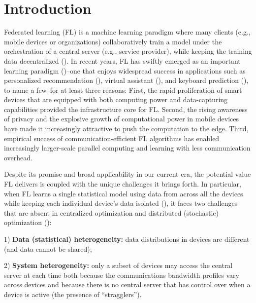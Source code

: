 

\section{Introduction}
Federated learning (FL) \cite{konevcny2016federated} is a machine learning paradigm where many clients (e.g., mobile devices or organizations) collaboratively train a model under the orchestration of a central server (e.g., service provider), while keeping the training data decentralized (\cite{smith2017federated, kairouz2019advances}). In recent years, FL has swiftly emerged as an important learning paradigm (\cite{mcmahan2016communication,li2018federated})--one that enjoys widespread success in applications such as personalized recommendation (\cite{chen2018federated}), virtual assistant (\cite{lam2019protecting}), and keyboard prediction (\cite{47586}), to name a few--for at least three reasons: First, the rapid proliferation of smart devices that are equipped with both computing power and data-capturing capabilities provided the infrastructure core for FL. Second, the rising awareness of privacy and the explosive growth of computational power in mobile devices have made it increasingly attractive to push the computation to the edge. Third, empirical success of communication-efficient FL algorithms has enabled increasingly larger-scale parallel computing and learning with less communication overhead.

Despite its promise and broad applicability in our current era, the potential value FL delivers is coupled with the unique challenges it brings forth. In particular, when FL learns a single statistical model using data from across all the devices while keeping each individual device's data isolated (\cite{kairouz2019advances}), it faces two challenges that are absent in centralized optimization and distributed (stochastic) optimization (\cite{nedic2009distributed,ram2010distributed,duchi2011dual,stich2018local,woodworth2018graph,yu2019parallel,yu2019linear, khaled2020tighter,koloskova2020unified}):

1) \textbf{Data (statistical) heterogeneity:} data distributions in devices are different (and data cannot be shared);

2) \textbf{System heterogeneity:} only a subset of devices may access the central server at each time both because the communications bandwidth profiles vary across devices and because there is no central server that has control over when a device is active (the presence of ``stragglers''). 

